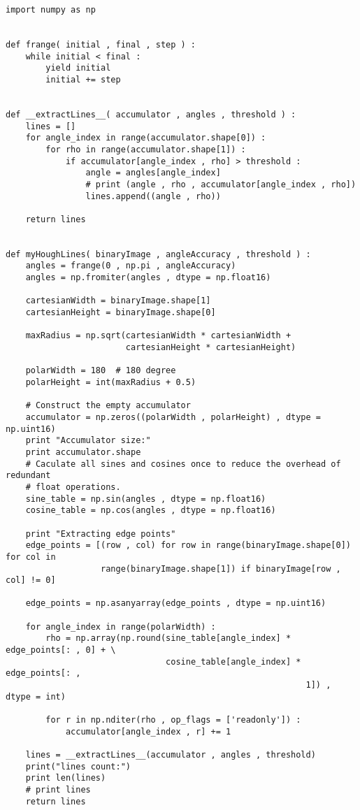 \begin{lstlisting}[caption=Python implementation for Hough Lines Detection,label=imp:hough-lines]
import numpy as np


def frange( initial , final , step ) :
    while initial < final :
        yield initial
        initial += step


def __extractLines__( accumulator , angles , threshold ) :
    lines = []
    for angle_index in range(accumulator.shape[0]) :
        for rho in range(accumulator.shape[1]) :
            if accumulator[angle_index , rho] > threshold :
                angle = angles[angle_index]
                # print (angle , rho , accumulator[angle_index , rho])
                lines.append((angle , rho))

    return lines


def myHoughLines( binaryImage , angleAccuracy , threshold ) :
    angles = frange(0 , np.pi , angleAccuracy)
    angles = np.fromiter(angles , dtype = np.float16)

    cartesianWidth = binaryImage.shape[1]
    cartesianHeight = binaryImage.shape[0]

    maxRadius = np.sqrt(cartesianWidth * cartesianWidth +
                        cartesianHeight * cartesianHeight)

    polarWidth = 180  # 180 degree
    polarHeight = int(maxRadius + 0.5)

    # Construct the empty accumulator
    accumulator = np.zeros((polarWidth , polarHeight) , dtype = np.uint16)
    print "Accumulator size:"
    print accumulator.shape
    # Caculate all sines and cosines once to reduce the overhead of redundant
    # float operations.
    sine_table = np.sin(angles , dtype = np.float16)
    cosine_table = np.cos(angles , dtype = np.float16)

    print "Extracting edge points"
    edge_points = [(row , col) for row in range(binaryImage.shape[0]) for col in
                   range(binaryImage.shape[1]) if binaryImage[row , col] != 0]

    edge_points = np.asanyarray(edge_points , dtype = np.uint16)

    for angle_index in range(polarWidth) :
        rho = np.array(np.round(sine_table[angle_index] * edge_points[: , 0] + \
                                cosine_table[angle_index] * edge_points[: ,
                                                            1]) , dtype = int)

        for r in np.nditer(rho , op_flags = ['readonly']) :
            accumulator[angle_index , r] += 1

    lines = __extractLines__(accumulator , angles , threshold)
    print("lines count:")
    print len(lines)
    # print lines
    return lines
\end{lstlisting}
